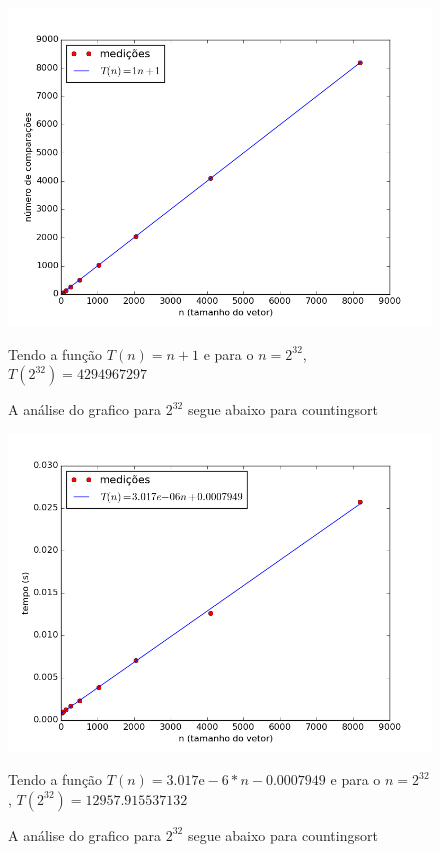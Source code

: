 \documentclass[12pt,a4paper,twoside]{report}
\begin{document}
\begin{figure}[ht]
\centering \includegraphics[scale=0.8]{../countingsort/imagens/countingsortCrescente1.png}
\caption{A análise do grafico para $2^{32}$ segue abaixo para countingsort}

Tendo a função $T(n) = n+1 $ e para o $n =2^{32}$, $T(2^{32}) = 4294967297 $ 
\label{fig:countingsortCrescente1}
\end{figure}




\begin{figure}[ht]
\centering \includegraphics[scale=0.8]{../countingsort/imagens/countingsortDecrescente0.png}
\caption{A análise do grafico para $2^{32}$ segue abaixo para countingsort}

Tendo a função $T(n) = 3.017\mathrm{e}-6*n-0.0007949$ e para o $n =2^{32}$, $T(2^{32}) = 12957.915537132$ 
\label{fig:countingsortDecrescente0}
\end{figure}
\end{document}
